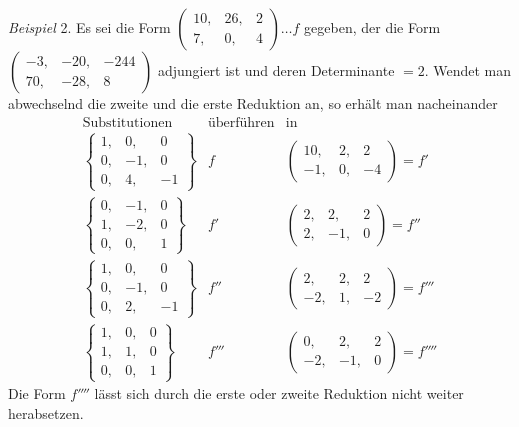 \emph{Beispiel} 2. Es sei die Form \(\left(\begin{smallmatrix}10,&26,&2\\7,&0,&4\end{smallmatrix}\right)\ldots f\) gegeben, der die Form \(\left(\begin{smallmatrix}-3,&-20,&-244\\70,&-28,&8\end{smallmatrix}\right)\) adjungiert ist und deren Determinante \(=2\). Wendet man abwechselnd die zweite und die erste Reduktion an, so erhält man nacheinander
\[
\begin{array}{c|c|c}
\text{Substitutionen}&\text{überführen}&\text{in}\\[3pt]
\left\{\begin{smallmatrix}1,&0,&0\\0,&-1,&0\\0,&4,&-1\end{smallmatrix}\right\}
&f&\left(\begin{smallmatrix}10,&2,&2\\-1,&0,&-4\end{smallmatrix}\right)=f'\\[6pt]
\left\{\begin{smallmatrix}0,&-1,&0\\1,&-2,&0\\0,&0,&1\end{smallmatrix}\right\}
&f'&\left(\begin{smallmatrix}2,&2,&2\\2,&-1,&0\end{smallmatrix}\right)=f''\\[6pt]
\left\{\begin{smallmatrix}1,&0,&0\\0,&-1,&0\\0,&2,&-1\end{smallmatrix}\right\}
&f''&\left(\begin{smallmatrix}2,&2,&2\\-2,&1,&-2\end{smallmatrix}\right)=f'''\\[6pt]
\left\{\begin{smallmatrix}1,&0,&0\\1,&1,&0\\0,&0,&1\end{smallmatrix}\right\}
&f'''&\left(\begin{smallmatrix}0,&2,&2\\-2,&-1,&0\end{smallmatrix}\right)=f''''
\end{array}
\]
Die Form \(f''''\) lässt sich durch die erste oder zweite Reduktion nicht weiter herabsetzen.

